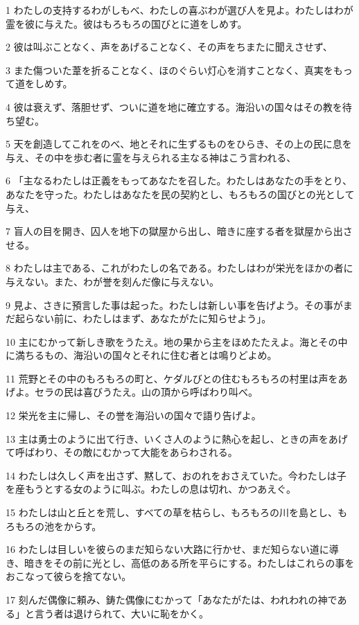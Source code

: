 \par 1 わたしの支持するわがしもべ、わたしの喜ぶわが選び人を見よ。わたしはわが霊を彼に与えた。彼はもろもろの国びとに道をしめす。
\par 2 彼は叫ぶことなく、声をあげることなく、その声をちまたに聞えさせず、
\par 3 また傷ついた葦を折ることなく、ほのぐらい灯心を消すことなく、真実をもって道をしめす。
\par 4 彼は衰えず、落胆せず、ついに道を地に確立する。海沿いの国々はその教を待ち望む。
\par 5 天を創造してこれをのべ、地とそれに生ずるものをひらき、その上の民に息を与え、その中を歩む者に霊を与えられる主なる神はこう言われる、
\par 6 「主なるわたしは正義をもってあなたを召した。わたしはあなたの手をとり、あなたを守った。わたしはあなたを民の契約とし、もろもろの国びとの光として与え、
\par 7 盲人の目を開き、囚人を地下の獄屋から出し、暗きに座する者を獄屋から出させる。
\par 8 わたしは主である、これがわたしの名である。わたしはわが栄光をほかの者に与えない。また、わが誉を刻んだ像に与えない。
\par 9 見よ、さきに預言した事は起った。わたしは新しい事を告げよう。その事がまだ起らない前に、わたしはまず、あなたがたに知らせよう」。
\par 10 主にむかって新しき歌をうたえ。地の果から主をほめたたえよ。海とその中に満ちるもの、海沿いの国々とそれに住む者とは鳴りどよめ。
\par 11 荒野とその中のもろもろの町と、ケダルびとの住むもろもろの村里は声をあげよ。セラの民は喜びうたえ。山の頂から呼ばわり叫べ。
\par 12 栄光を主に帰し、その誉を海沿いの国々で語り告げよ。
\par 13 主は勇士のように出て行き、いくさ人のように熱心を起し、ときの声をあげて呼ばわり、その敵にむかって大能をあらわされる。
\par 14 わたしは久しく声を出さず、黙して、おのれをおさえていた。今わたしは子を産もうとする女のように叫ぶ。わたしの息は切れ、かつあえぐ。
\par 15 わたしは山と丘とを荒し、すべての草を枯らし、もろもろの川を島とし、もろもろの池をからす。
\par 16 わたしは目しいを彼らのまだ知らない大路に行かせ、まだ知らない道に導き、暗きをその前に光とし、高低のある所を平らにする。わたしはこれらの事をおこなって彼らを捨てない。
\par 17 刻んだ偶像に頼み、鋳た偶像にむかって「あなたがたは、われわれの神である」と言う者は退けられて、大いに恥をかく。
